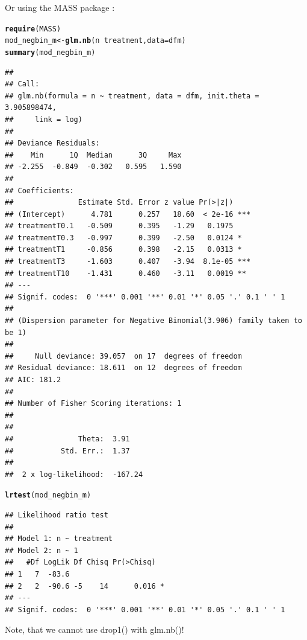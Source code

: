 \documentclass{scrartcl}\usepackage[]{graphicx}\usepackage[]{color}
\makeatletter
\newcommand{\hlopt}[1]{\textcolor[rgb]{0,0,0}{#1}}%
\newcommand{\hlstd}[1]{\textcolor[rgb]{0.345,0.345,0.345}{#1}}%
\newcommand{\hlkwb}[1]{\textcolor[rgb]{0.69,0.353,0.396}{#1}}%
\newcommand{\hlkwc}[1]{\textcolor[rgb]{0.333,0.667,0.333}{#1}}%
\newcommand{\hlkwd}[1]{\textcolor[rgb]{0.737,0.353,0.396}{\textbf{#1}}}%
\newenvironment{kframe}{%
 \def\at@end@of@kframe{}%
 \ifinner\ifhmode%
  \def\at@end@of@kframe{\end{minipage}}%
  \begin{minipage}{\columnwidth}%
 \fi\fi%
 \def\FrameCommand##1{\hskip\@totalleftmargin \hskip-\fboxsep
 \colorbox{shadecolor}{##1}\hskip-\fboxsep
     \hskip-\linewidth \hskip-\@totalleftmargin \hskip\columnwidth}%
 \MakeFramed {\advance\hsize-\width
   \@totalleftmargin\z@ \linewidth\hsize
   \@setminipage}}%
 {\par\unskip\endMakeFramed%
 \at@end@of@kframe}
\newenvironment{knitrout}{}{} %
\makeatother
\begin{document}
Or using the MASS package \citep{venables_modern_2002}:
\begin{knitrout}
\color{fgcolor}\begin{kframe}
\begin{alltt}
\hlkwd{require}\hlstd{(MASS)}
\hlstd{mod_negbin_m} \hlkwb{<-} \hlkwd{glm.nb}\hlstd{(n} \hlopt{~} \hlstd{treatment,} \hlkwc{data} \hlstd{= dfm)}
\hlkwd{summary}\hlstd{(mod_negbin_m)}
\end{alltt}
\begin{verbatim}
## 
## Call:
## glm.nb(formula = n ~ treatment, data = dfm, init.theta = 3.905898474, 
##     link = log)
## 
## Deviance Residuals: 
##    Min      1Q  Median      3Q     Max  
## -2.255  -0.849  -0.302   0.595   1.590  
## 
## Coefficients:
##               Estimate Std. Error z value Pr(>|z|)    
## (Intercept)      4.781      0.257   18.60  < 2e-16 ***
## treatmentT0.1   -0.509      0.395   -1.29   0.1975    
## treatmentT0.3   -0.997      0.399   -2.50   0.0124 *  
## treatmentT1     -0.856      0.398   -2.15   0.0313 *  
## treatmentT3     -1.603      0.407   -3.94  8.1e-05 ***
## treatmentT10    -1.431      0.460   -3.11   0.0019 ** 
## ---
## Signif. codes:  0 '***' 0.001 '**' 0.01 '*' 0.05 '.' 0.1 ' ' 1
## 
## (Dispersion parameter for Negative Binomial(3.906) family taken to be 1)
## 
##     Null deviance: 39.057  on 17  degrees of freedom
## Residual deviance: 18.611  on 12  degrees of freedom
## AIC: 181.2
## 
## Number of Fisher Scoring iterations: 1
## 
## 
##               Theta:  3.91 
##           Std. Err.:  1.37 
## 
##  2 x log-likelihood:  -167.24
\end{verbatim}
\begin{alltt}
\hlkwd{lrtest}\hlstd{(mod_negbin_m)}
\end{alltt}
\begin{verbatim}
## Likelihood ratio test
## 
## Model 1: n ~ treatment
## Model 2: n ~ 1
##   #Df LogLik Df Chisq Pr(>Chisq)  
## 1   7  -83.6                      
## 2   2  -90.6 -5    14      0.016 *
## ---
## Signif. codes:  0 '***' 0.001 '**' 0.01 '*' 0.05 '.' 0.1 ' ' 1
\end{verbatim}
\end{kframe}
\end{knitrout}
Note, that we cannot use drop1() with glm.nb()!





\end{document}
